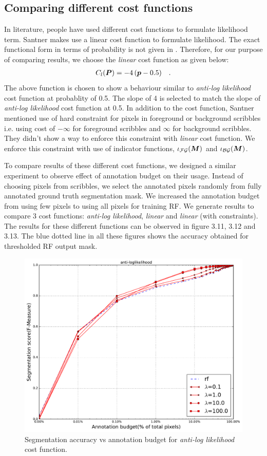 \subsection{Comparing different cost functions}
In literature, people have used different cost functions to formulate likelihood term.
Santner \cite{santner:2009} makes use a linear cost function to formulate likelihood. The exact functional form in terms of probability is not given in \cite{santner:2009}. Therefore, for our purpose of comparing results, we choose the \textit{linear} cost function as given below:
\begin{align*}
\mathop{{}C_l}(\boldsymbol{P}) = -4\,(\boldsymbol{p}-0.5) \quad .
\end{align*}
The above function is chosen to show a behaviour similar to \textit{anti-log likelihood} cost function at probablity of 0.5. The slope of 4 is selected to match the slope of \textit{anti-log likelihood} cost function at 0.5. In addition to the cost function, Santner \cite{santner:2009} mentioned use of hard constraint for pixels in foreground or background scribbles i.e. using cost of $-\infty$ for foreground scribbles and $\infty$ for background scribbles. They didn't show a way to enforce this constraint with \textit{linear} cost function. We enforce this constraint with use of indicator functions, $\iota_{\mathcal{FG}}(\boldsymbol{M})$ and $\iota_{\mathcal{BG}}(\boldsymbol{M})$. \par
To compare results of these different cost functions, we designed a similar experiment to observe effect of annotation budget on their usage. Instead of choosing pixels from scribbles, we select the annotated pixels randomly from fully annotated ground truth segmentation mask. We increased the annotation budget from using few pixels to using all pixels for training RF. We generate results to compare 3 cost functions: \textit{anti-log likelihood}, \textit{linear} and \textit{linear} (with constraints). The results for these different functions can be observed in figure 3.11, 3.12 and 3.13. The blue dotted line in all these figures shows the accuracy obtained for thresholded RF output mask.

\begin{figure}[h!] \label{fig:nll}
\centering
 \includegraphics[width=0.75\linewidth]{figures/anti_nll.pdf}
\caption{Segmentation accuracy vs annotation budget for \textit{anti-log likelihood} cost function.}
\end{figure}



